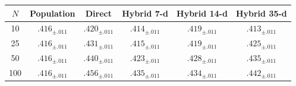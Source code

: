 \begin{tabular}{@{}c cc ccc@{}}
\toprule
$N$ & Population & Direct & Hybrid 7-d & Hybrid 14-d & Hybrid 35-d \\
\midrule
10 & $.416_{\pm .011}$ & $.420_{\pm .011}$ & $.414_{\pm .011}$ & $.419_{\pm .011}$ & $.413_{\pm .011}$ \\
25 & $.416_{\pm .011}$ & $.431_{\pm .011}$ & $.415_{\pm .011}$ & $.419_{\pm .011}$ & $.425_{\pm .011}$ \\
50 & $.416_{\pm .011}$ & $.440_{\pm .011}$ & $.423_{\pm .011}$ & $.428_{\pm .011}$ & $.435_{\pm .011}$ \\
100 & $.416_{\pm .011}$ & $.456_{\pm .011}$ & $.435_{\pm .011}$ & $.434_{\pm .011}$ & $.442_{\pm .011}$ \\
\bottomrule
\end{tabular}

